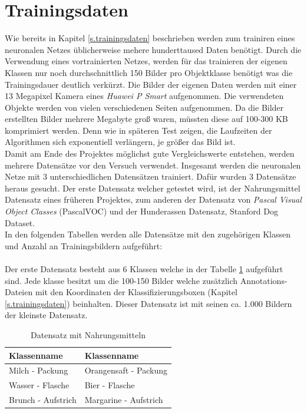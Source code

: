   \section{Trainingsdaten}\label{s.tdaten}
Wie bereits in Kapitel \ref{s.trainingsdaten} beschrieben werden zum trainiren eines neuronalen Netzes üblicherweise mehere hunderttaused Daten benötigt. Durch die Verwendung eines vortrainierten Netzes, werden für das trainieren der eigenen Klassen nur noch durchschnittlich 150 Bilder pro Objektklasse benötigt was die Trainingsdauer deutlich verkürzt. Die Bilder der eigenen Daten werden mit einer 13 Megapixel Kamera eines \textit{Huawei P Smart} aufgenommen. Die verwendeten Objekte werden von vielen verschiedenen Seiten aufgenommen. Da die Bilder erstellten Bilder mehrere Megabyte groß waren, müssten diese auf 100-300 KB komprimiert werden. Denn wie in späteren Test zeigen, die Laufzeiten der Algorithmen sich exponentiell verlängern, je größer das Bild ist.\\
Damit am Ende des Projektes möglichst gute Vergleichswerte entstehen, werden mehrere Datensätze vor den Versuch verwendet. Insgesamt werden die neuronalen Netze mit 3 unterschiedlichen Datensätzen trainiert. Dafür wurden 3 Datensätze heraus gesucht. Der erste Datensatz welcher getestet wird, ist der Nahrungsmittel Datensatz eines früheren Projektes, zum anderen der Datensatz von \textit{Pascal Visual Object Classes} (PascalVOC) und der Hunderassen Datensatz, Stanford Dog Dataset.\\
In den folgenden Tabellen werden alle Datensätze mit den zugehörigen Klassen und Anzahl an Trainingsbildern aufgeführt:\\\\
Der erste Datensatz besteht aus 6 Klassen welche in der Tabelle \ref{tab:nahrungsmittel} aufgeführt sind. Jede klasse besitzt um die 100-150 Bilder welche zusätzlich Annotations-Dateien mit den Koordinaten der Klassifizierungsboxen (Kapitel \ref{s.trainingsdaten}) beinhalten. Dieser Datensatz ist mit seinen ca. 1.000 Bildern der kleinste Datensatz. 
\begin{table}
[h]
\caption{Datensatz mit Nahrungsmitteln}
\centering
\begin{tabular}{|l|l|}
\hline
Klassenname & Klassenname\\
\hline
Milch - Packung & Orangensaft - Packung\\
Wasser - Flasche & Bier - Flasche\\
Brunch - Aufstrich & Margarine - Aufstrich\\
\hline
\end{tabular}
\label{tab:nahrungsmittel}
\end{table}
